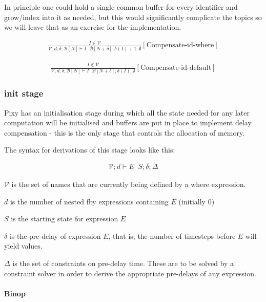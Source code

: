 \documentclass{scrartcl}
\DeclareMathOperator{\initrel}{\overset{init}{\Rightarrow}}
\DeclareMathOperator{\comprel}{\overset{compensate}{\Rightarrow}}
\begin{document}
    In principle one could hold a single common buffer for every identifier and grow/index into it as needed, but this would significantly complicate the topics so we will leave that as an exercise for the implementation.
    
    \begin{align*}
    \frac{
        I \in \mathcal{V}
    }{
        \mathcal{V}; d; \delta; \mathcal{B}[N] \vdash I \comprel \mathcal{B}[N+\delta]; \delta(I)+1; \emptyset
    }[\text{Compensate-id-where}]
    \end{align*}
    
    \begin{align*}
    \frac{
        I \notin \mathcal{V}
    }{
        \mathcal{V}; d; \delta; \mathcal{B}[N] \vdash I \comprel \mathcal{B}[N+\delta]; \delta(I); \emptyset
    }[\text{Compensate-id-default}]
    \end{align*}
    
    \subsubsection{init stage}
    
    Pixy has an initialisation stage during which all the state needed for any later computation will be initialised and buffers are put in place to implement delay compensation - this is the only stage that controls the allocation of memory.
    
    The syntax for derivations of this stage looks like this:
    
    \begin{align*}
    \mathcal{V}; d \vdash E \initrel S; \delta; \Delta
    \end{align*}
    
    $\mathcal{V}$ is the set of names that are currently being defined by a where expression.
    
    $d$ is the number of nested fby expressions containing $E$ (initially 0)
    
    $S$ is the starting state for expression $E$
    
    $\delta$ is the pre-delay of expression $E$, that is, the number of timesteps before $E$ will yield values.
    
    $\Delta$ is the set of constraints on pre-delay time. These are to be solved by a constraint solver in order to derive the appropriate pre-delays of any expression.
    
    \paragraph{Binop}
    
\end{document}
